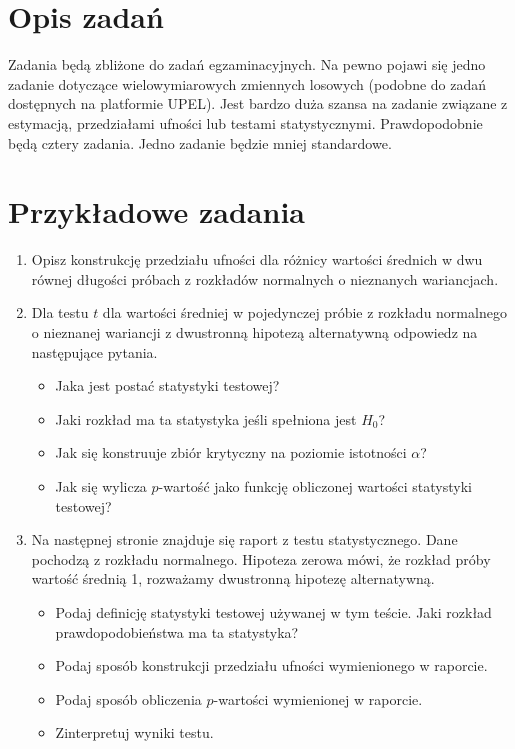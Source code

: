 \documentclass[polish]{article}
\begin{document}
\section{Opis zadań}
Zadania będą zbliżone do zadań egzaminacyjnych. Na pewno pojawi się jedno zadanie dotyczące wielowymiarowych zmiennych losowych (podobne do zadań dostępnych na platformie UPEL). Jest bardzo duża szansa na zadanie związane z estymacją, przedziałami ufności lub testami statystycznymi. Prawdopodobnie będą cztery zadania. Jedno zadanie będzie mniej standardowe.

\section{Przykładowe zadania}
\begin{enumerate}
    \item Opisz konstrukcję przedziału ufności dla różnicy wartości średnich w dwu równej długości próbach z rozkładów normalnych o nieznanych wariancjach.
    \item Dla testu $t$ dla wartości średniej w pojedynczej próbie z rozkładu normalnego o nieznanej wariancji z dwustronną hipotezą alternatywną odpowiedz na następujące pytania.

\begin{itemize}
    \item[a)] Jaka jest postać statystyki testowej?
    \item[b)] Jaki rozkład ma ta statystyka jeśli spełniona jest $H_0$?
    \item[c)] Jak się konstruuje zbiór krytyczny na poziomie istotności $\alpha$?
    \item[d)] Jak się wylicza $p$-wartość jako funkcję obliczonej wartości statystyki testowej?
\end{itemize}
    \item Na następnej stronie znajduje się raport z testu statystycznego. Dane pochodzą z rozkładu normalnego. Hipoteza zerowa mówi, że rozkład próby wartość średnią 1, rozważamy dwustronną hipotezę alternatywną.

\begin{itemize}
    \item[a)] Podaj definicję statystyki testowej używanej w tym teście. Jaki rozkład prawdopodobieństwa ma ta statystyka?
    \item[b)] Podaj sposób konstrukcji przedziału ufności wymienionego w raporcie.
    \item[c)] Podaj sposób obliczenia $p$-wartości wymienionej w raporcie.
    \item[d)] Zinterpretuj wyniki testu.
\end{itemize}


\end{enumerate}
\end{document}
